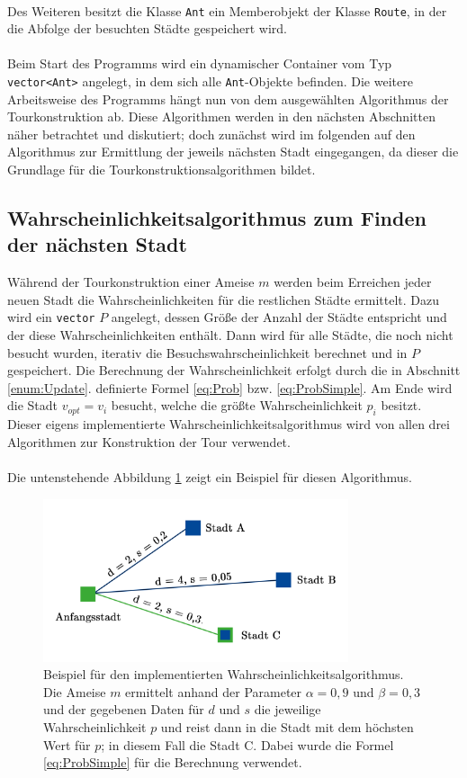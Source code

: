 \documentclass[doktyp=barbeit, sprache=german]{TUBAFarbeiten}
\begin{document}
\\Des Weiteren besitzt die Klasse \texttt{Ant} ein Memberobjekt der Klasse \texttt{Route}, in der die Abfolge der besuchten Städte gespeichert wird. 
\\\\Beim Start des Programms wird ein dynamischer Container vom Typ \texttt{vector<Ant>} angelegt, in dem sich alle \texttt{Ant}-Objekte befinden. Die weitere Arbeitsweise des Programms hängt nun von dem ausgewählten Algorithmus der Tourkonstruktion ab. Diese Algorithmen werden in den nächsten Abschnitten näher betrachtet und diskutiert; doch zunächst wird im folgenden auf den Algorithmus zur Ermittlung der jeweils nächsten Stadt eingegangen, da dieser die Grundlage für die Tourkonstruktionsalgorithmen bildet.
\subsection{Wahrscheinlichkeitsalgorithmus zum Finden der nächsten Stadt}
\label{structure}
Während der Tourkonstruktion einer Ameise $m$ werden beim Erreichen jeder neuen Stadt die Wahrscheinlichkeiten für die restlichen Städte ermittelt. 
Dazu wird ein \texttt{vector} $P$ angelegt, dessen Größe der Anzahl der Städte entspricht und der diese Wahrscheinlichkeiten enthält. Dann wird für alle Städte, die noch nicht besucht wurden, iterativ die Besuchswahrscheinlichkeit berechnet und in $P$ gespeichert. Die Berechnung der Wahrscheinlichkeit erfolgt durch die in Abschnitt \ref{enum:Update}. definierte Formel \ref{eq:Prob} bzw. \ref{eq:ProbSimple}. Am Ende wird die Stadt $v_{opt} = v_i$ besucht, welche die größte Wahrscheinlichkeit $p_i$ besitzt. \\Dieser eigens implementierte Wahrscheinlichkeitsalgorithmus wird  von allen drei Algorithmen zur Konstruktion der Tour verwendet.
\\\\Die untenstehende Abbildung \ref{img:probimage} zeigt ein Beispiel für diesen Algorithmus. 
\begin{figure}
\captionsetup{justification=centering}
  \centering
     \includegraphics[width=0.8\textwidth]{images/probimage.png}
  \caption[Beispiel für den implementierten Wahrscheinlichkeitsalgorithmus]{Beispiel für den implementierten Wahrscheinlichkeitsalgorithmus. Die Ameise $m$ ermittelt anhand der Parameter $\alpha = 0,9$ und $\beta = 0,3$ und der gegebenen Daten für $d$ und $s$ die jeweilige Wahrscheinlichkeit $p$ und reist dann in die Stadt mit dem höchsten Wert für $p$; in diesem Fall die Stadt C. Dabei wurde die Formel \ref{eq:ProbSimple} für die Berechnung verwendet.}
  \label{img:probimage}
\end{figure}
\end{document}

